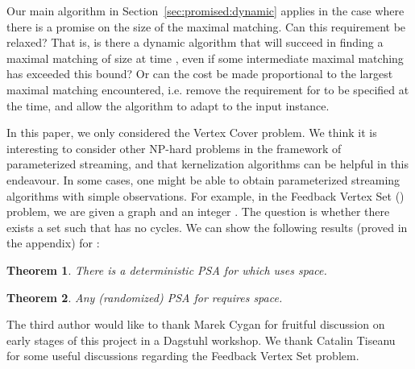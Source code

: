 \documentclass[11pt,letter]{article}
\newtheorem{theorem}{Theorem}
\renewcommand{\paragraph}[1]{\medskip \noindent {\bf #1}}
\begin{document}
Our main algorithm in Section~\ref{sec:promised:dynamic} applies in the case where
there is a promise on the size of the maximal matching.
Can this requirement be relaxed?
That is, is there a dynamic algorithm that will succeed in finding a
maximal matching of size  at time , even if some intermediate
maximal matching has exceeded this bound?  Or can the cost be made
proportional to the largest maximal matching encountered, i.e. remove
the requirement for  to be specified at the time, and allow the
algorithm to adapt to the input instance.

\paragraph{Other Problems.} In this paper, we only considered the
Vertex Cover problem. We think it is interesting to consider other
NP-hard problems in the framework of parameterized streaming, and that
kernelization algorithms can be helpful in this endeavour. In some
cases, one might be able to obtain parameterized streaming algorithms
with simple observations. For example, in the Feedback Vertex Set
() problem, we are given a graph  and an integer
. The question is whether there exists a set  such
that  has no cycles.
We can show the following results (proved in the appendix)
for :

\begin{theorem}
\label{thm:fvs:upper}
There is a deterministic PSA for  which uses  space.
\end{theorem}

\begin{theorem}
\label{thm:fvs:lower}
Any (randomized) PSA for  requires  space.
\end{theorem}



\paragraph{Acknowledgments.}
The third author would like to thank Marek Cygan for fruitful discussion
on early  stages of this project in a Dagstuhl workshop.
We thank Catalin Tiseanu for some useful discussions regarding the
Feedback Vertex Set problem.



\newcommand{\Proc}{Proceedings of the~}
\end{document}
